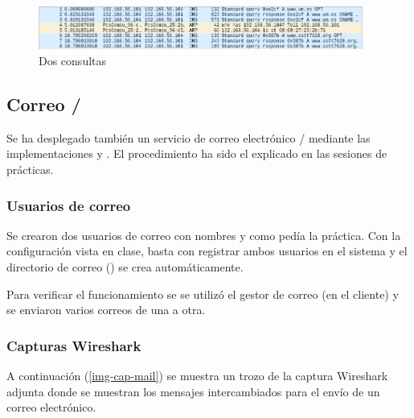 \begin{figure}[h]
    \centering
    \includegraphics[width=0.95\textwidth]{tests/capture-dns.png}
    \caption{Dos consultas {\DNS}}
    \label{img-cap-dns}
\end{figure}

\subsection{Correo {\SMTP/\POP}}
Se ha desplegado también un servicio de correo electrónico {\SMTP/\POP} mediante las implementaciones  y . El procedimiento ha sido el explicado en las sesiones de prácticas.

\subsubsection{Usuarios de correo}
Se crearon dos usuarios de correo con nombres  y  como pedía la práctica. Con la configuración vista en clase, basta con registrar ambos usuarios en el sistema y el directorio de correo () se crea automáticamente.

Para verificar el funcionamiento se se utilizó el gestor de correo  (en el cliente) y se enviaron varios correos de una a otra.

\subsubsection{Capturas Wireshark}
A continuación (\cref{img-cap-mail}) se muestra un trozo de la captura Wireshark adjunta donde se muestran los mensajes intercambiados para el envío de un correo electrónico.

